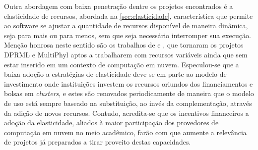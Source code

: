 \documentclass[english,brazilian]{UNISINOSmonografia} %
\begin{document}


Outra abordagem com baixa penetração dentre os projetos encontrados é a elasticidade de recursos, abordada na \autoref{sec:elasticidade}, característica que permite ao software se ajustar a quantidade de recursos disponível de maneira dinâmica, seja para mais ou para menos, sem que seja necessário interromper sua execução.
Menção honrosa neste sentido são os trabalhos de  e , que tornaram os projetos DPRML e MultiPhyl aptos a trabalharem com recursos variáveis ainda que sem estar inserido em um contexto de computação em nuvem.
Especulou-se que a baixa adoção a estratégias de elasticidade deve-se em parte ao modelo de investimento onde instituições investem os recursos oriundos dos financiamentos e bolsas em \textit{clusters}, e estes são renovados periodicamente de maneira que o modelo de uso está sempre baseado na substituição, ao invés da complementação, através da adição de novos recursos.
Contudo, acredita-se que os incentivos financeiros a adoção da elasticidade, aliados à maior participação dos provedores de computação em nuvem no meio acadêmico, farão com que aumente a relevância de projetos já preparados a tirar proveito destas capacidades.
\end{document}
